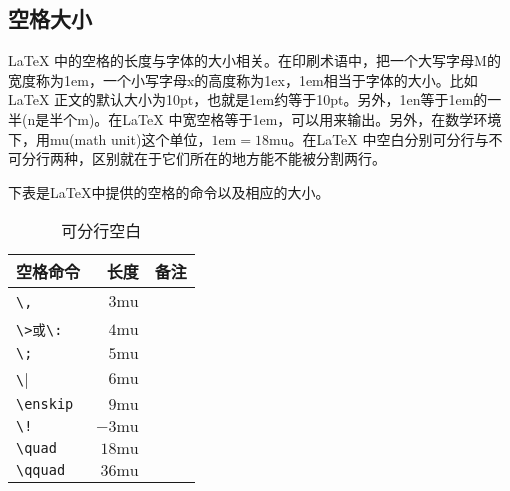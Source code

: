 {\subsection{空格大小}
\LaTeX
中的空格的长度与字体的大小相关。在印刷术语中，把一个大写字母M的宽度称为1em，一个小写字母x的高度称为1ex，1em相当于字体的大小。比如\LaTeX
正文的默认大小为10pt，也就是1em约等于10pt。另外，1en等于1em的一半(n是半个m)。在\LaTeX
中宽空格等于1em，可以用\texinline{\quad}来输出。另外，在数学环境下，用mu(math unit)这个单位，$1\text{em}=18\text{mu}$。在\LaTeX
中空白分别可分行与不可分行两种，区别就在于它们所在的地方能不能被分割两行。

下表是\LaTeX 中提供的空格的命令以及相应的大小。

\begin{table}[htpb]
	\centering
	\begin{tabular}{lrl} \toprule
		空格命令                  & 长度          & 备注                          \\ \midrule
		\verb|\,|                 & $3\text{mu}$  & \Rightarrow\,\Leftarrow       \\
		\verb|\>或\:|             & $4\text{mu}$  & \Rightarrow\>\Leftarrow       \\
		\verb|\;|                 & $5\text{mu}$  & \Rightarrow\;\Leftarrow       \\
		\verb|\|\textvisiblespace & $6\text{mu}$  & \Rightarrow\ \Leftarrow       \\
		\verb|\enskip|            & $9\text{mu}$  & \Rightarrow\enskip \Leftarrow \\
		\verb|\!|                 & $-3\text{mu}$ & \Rightarrow\!\Leftarrow       \\
		\verb|\quad|              & $18\text{mu}$ & \Rightarrow\quad \Leftarrow   \\
		\verb|\qquad|             & $36\text{mu}$ & \Rightarrow\qquad \Leftarrow  \\ \bottomrule
	\end{tabular}
	\caption{可分行空白}
\end{table}

}
